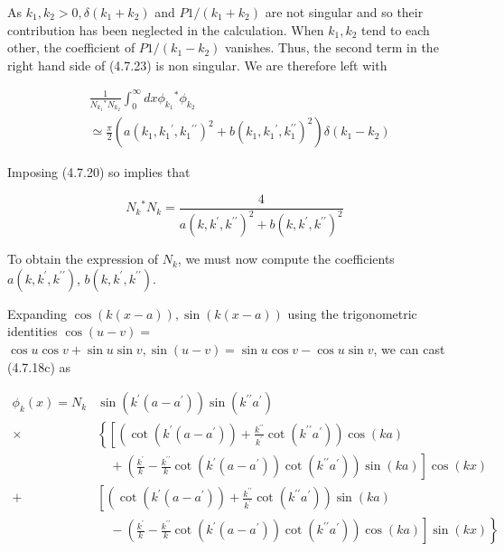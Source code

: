 \documentclass{article}
\begin{document}
As $k_{1}, k_{2}>0, \delta\left(k_{1}+k_{2}\right)$ and $P 1 /\left(k_{1}+k_{2}\right)$ are not singular and so their contribution has been neglected in the calculation. When $k_{1}, k_{2}$ tend to each other, the coefficient of $P 1 /\left(k_{1}-k_{2}\right)$ vanishes. Thus, the second term in the right hand side of (4.7.23) is non singular. We are therefore left with
 
\begin{align*}
& \frac{1}{N_{k_{1}}{ }^{*} N_{k_{2}}} \int_{0}^{\infty} d x \phi_{k_{1}}{ }^{*} \phi_{k_{2}}  \tag{4.7.24}\\
& \simeq \frac{\pi}{2}\left(a\left(k_{1}, k_{1}{ }^{\prime}, k_{1}{ }^{\prime \prime}\right)^{2}+b\left(k_{1}, k_{1}{ }^{\prime}, k_{1}^{\prime \prime}\right)^{2}\right) \delta\left(k_{1}-k_{2}\right)
\end{align*}
 

Imposing (4.7.20) so implies that
 
\begin{equation*}
N_{k}{ }^{*} N_{k}=\frac{4}{a\left(k, k^{\prime}, k^{\prime \prime}\right)^{2}+b\left(k, k^{\prime}, k^{\prime \prime}\right)^{2}} \tag{4.7.25}
\end{equation*}
 

To obtain the expression of $N_{k}$, we must now compute the coefficients $a\left(k, k^{\prime}, k^{\prime \prime}\right)$, $b\left(k, k^{\prime}, k^{\prime \prime}\right)$.

Expanding $\cos (k(x-a)), \sin (k(x-a))$ using the trigonometric identities $\cos (u-v)=$ $\cos u \cos v+\sin u \sin v, \sin (u-v)=\sin u \cos v-\cos u \sin v$, we can cast (4.7.18c) as
 
\begin{align*}
\phi_{k}(x)=N_{k} & \sin \left(k^{\prime}\left(a-a^{\prime}\right)\right) \sin \left(k^{\prime \prime} a^{\prime}\right)  \tag{4.7.26}\\
\times & \left\{\left[\left(\cot \left(k^{\prime}\left(a-a^{\prime}\right)\right)+\frac{k^{\prime \prime}}{k^{\prime}} \cot \left(k^{\prime \prime} a^{\prime}\right)\right) \cos (k a)\right.\right. \\
& \left.\quad+\left(\frac{k^{\prime}}{k}-\frac{k^{\prime \prime}}{k} \cot \left(k^{\prime}\left(a-a^{\prime}\right)\right) \cot \left(k^{\prime \prime} a^{\prime}\right)\right) \sin (k a)\right] \cos (k x) \\
+ & {\left[\left(\cot \left(k^{\prime}\left(a-a^{\prime}\right)\right)+\frac{k^{\prime \prime}}{k^{\prime}} \cot \left(k^{\prime \prime} a^{\prime}\right)\right) \sin (k a)\right.} \\
& \left.\left.\quad-\left(\frac{k^{\prime}}{k}-\frac{k^{\prime \prime}}{k} \cot \left(k^{\prime}\left(a-a^{\prime}\right)\right) \cot \left(k^{\prime \prime} a^{\prime}\right)\right) \cos (k a)\right] \sin (k x)\right\}
\end{align*}
 
\end{document}
